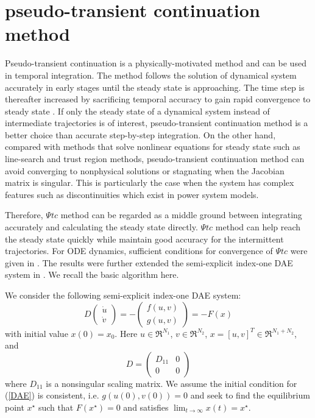 \documentclass[journal]{IEEEtran}
\begin{document}
\section{pseudo-transient continuation method}\label{sectiondyPTC}
Pseudo-transient continuation is a physically-motivated method and can be used in temporal integration. The method follows the solution of dynamical system accurately in early stages until the steady state is approaching. The time step is thereafter increased by sacrificing temporal accuracy to gain rapid convergence to steady state \cite{Kelley:article}. If only the steady state of a dynamical system instead of intermediate trajectories is of interest, pseudo-transient continuation method is a better choice than accurate step-by-step integration. On the other hand, compared with methods that solve nonlinear equations for steady state such as line-search and trust region methods, pseudo-transient continuation method can avoid converging to nonphysical solutions or stagnating when the Jacobian matrix is singular. This is particularly the case when the system has complex features such as discontinuities which exist in power system models.

Therefore, $\Psi tc$ method can be regarded as a middle ground between integrating accurately and calculating the steady state directly. $\Psi tc$ method can help reach the steady state quickly while maintain good accuracy for the intermittent trajectories. For ODE dynamics, sufficient conditions for convergence of $\Psi tc$ were given in \cite{Kelley:article}. The results were further extended the semi-explicit index-one DAE system in \cite{Kelley:article2}. We recall the basic algorithm here.


We consider the following semi-explicit index-one DAE system:
\begin{equation}\label{DAE}
D\left(\begin{array}{c}\dot{u}\\\dot{v}\end{array}\right)=-\left(\begin{array}{c}f(u,v)\\g(u,v)\end{array}\right)=-F(x)
\end{equation}
with initial value $x(0)=x_0$. Here $u\in \Re^{N_1}$, $v\in \Re^{N_2}$, $x=[u,v]^T \in \Re^{N_1+N_2}$, and
\begin{equation}
D=\left(\begin{array}{cc}D_{11}&0\\0&0\end{array}\right)\nonumber
\end{equation}
where $D_{11}$ is a nonsingular scaling matrix. We assume the initial condition for (\ref{DAE}) is consistent, i.e. $g(u(0),v(0))=0$ and seek to find the equilibrium point $x^\star$ such that $F(x^\star)=0$ and satisfies
$\lim_{t\to \infty}x(t)=x^\star$.
\end{document}
